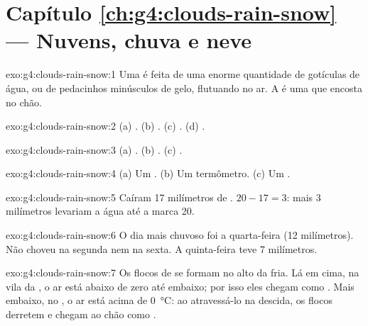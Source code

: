 \section*{Capítulo \ref{ch:g4:clouds-rain-snow} --- Nuvens, chuva e neve}

\begin{solution}{exo:g4:clouds-rain-snow:1}
Uma  é feita de uma enorme quantidade de gotículas de água, ou de
pedacinhos minúsculos de gelo, flutuando no ar. A  é uma  que
encosta no chão.
\end{solution}

\begin{solution}{exo:g4:clouds-rain-snow:2}
(a) . (b) . (c) . (d) .
\end{solution}

\begin{solution}{exo:g4:clouds-rain-snow:3}
(a) . (b) . (c) .
\end{solution}

\begin{solution}{exo:g4:clouds-rain-snow:4}
(a) Um . (b) Um termômetro. (c) Um .
\end{solution}

\begin{solution}{exo:g4:clouds-rain-snow:5}
Caíram 17 milímetros de . $20 - 17 = 3$: mais 3 milímetros levariam
a água até a marca 20.
\end{solution}

\begin{solution}{exo:g4:clouds-rain-snow:6}
O dia mais chuvoso foi a quarta-feira (12 milímetros). Não choveu na
segunda nem na sexta. A quinta-feira teve 7 milímetros.
\end{solution}

\begin{solution}{exo:g4:clouds-rain-snow:7}
Os flocos de  se formam no alto da  fria. Lá em cima, na vila da
, o ar está abaixo de zero até embaixo; por isso eles chegam como
. Mais embaixo, no , o ar está acima de \SI{0}{\celsius}: ao
atravessá-lo na descida, os flocos derretem e chegam ao chão como .
\end{solution}

